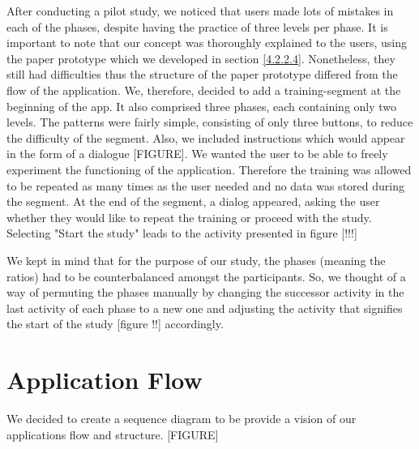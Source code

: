 After conducting a pilot study, we noticed that users made lots of mistakes in each of the phases, despite having the practice of three levels per phase. It is important to note that our concept was thoroughly explained to the users, using the paper prototype which we developed in section \ref{4.2.2.4}. Nonetheless, they still had difficulties thus the structure of the paper prototype differed from the flow of the application. We, therefore, decided to add a training-segment at the beginning of the app. It also comprised three phases, each containing only two levels. The patterns were fairly simple, consisting of only three buttons, to reduce the difficulty of the segment. Also, we included instructions which would appear in the form of a dialogue [FIGURE]. We wanted the user to be able to freely experiment the functioning of the application. Therefore the training was allowed to be repeated as many times as the user needed and no data was stored during the segment. At the end of the segment, a dialog appeared, asking the user whether they would like to repeat the training or proceed with the study. Selecting "Start the study" leads to the activity presented in figure [!!!]

We kept in mind that for the purpose of our study, the phases (meaning the ratios) had to be counterbalanced amongst the participants. So, we thought of a way of permuting the phases manually by changing the successor activity in the last activity of each phase to a new one and adjusting the activity that signifies the start of the study [figure !!] accordingly.  

\section{Application Flow}

We decided to create a sequence diagram to be provide a vision of our applications flow and structure. [FIGURE]
